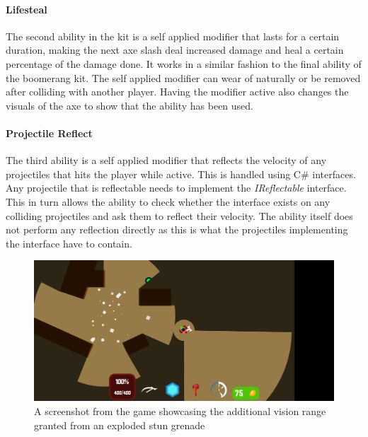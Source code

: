 \paragraph{Lifesteal}
The second ability in the kit is a self applied modifier that lasts for a certain duration, making the next axe slash deal increased damage and heal a certain percentage of the damage done. It works in a similar fashion to the final ability of the boomerang kit. The self applied modifier can wear of naturally or be removed after colliding with another player. Having the modifier active also changes the visuals of the axe to show that the ability has been used. 

\paragraph{Projectile Reflect}
The third ability is a self applied modifier that reflects the velocity of any projectiles that hits the player while active. This is handled using C\# interfaces. Any projectile that is reflectable needs to implement the \emph{IReflectable} interface. This in turn allows the ability to check whether the interface exists on any colliding projectiles and ask them to reflect their velocity. The ability itself does not perform any reflection directly as this is what the projectiles implementing the interface have to contain.

\begin{figure}[tbph]  %
  \centering
  \includegraphics[width=\textwidth]{images/stunGrenade}
  \caption[Screenshot of the brawler kit's stun grenade]{A screenshot from the game showcasing the additional vision range granted from an exploded stun grenade}
  \label{fig:brawlerStunGrenade}
\end{figure}

